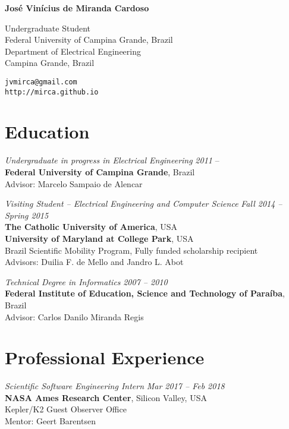 \documentclass[10pt]{article}
\begin{document}
\pagestyle{empty}
\begin{titlepage}
     {\Large{\textbf{Jos\'e Vin\'icius de Miranda Cardoso}}}
     \vspace{.5cm}

    \begin{minipage}[b]{8cm}
     Undergraduate Student\\
     Federal University of Campina Grande, Brazil\\
     Department of Electrical Engineering\\
     Campina Grande, Brazil
    \end{minipage}
    \hfill
    \begin{minipage}[b]{4cm}
        \hfill \texttt{jvmirca@gmail.com}\\
        \texttt{http://mirca.github.io}
    \end{minipage}


\section*{Education}

\emph{Undergraduate in progress in Electrical Engineering} \hfill \textit{2011} --\\
\textbf{Federal University of Campina Grande}, Brazil\\
Advisor: Marcelo Sampaio de Alencar
\vspace{.5cm}

\emph{Visiting Student -- Electrical Engineering and Computer Science} \hfill \textit{Fall 2014 -- Spring 2015} \\
\textbf{The Catholic University of America}, USA\\
\textbf{University of Maryland at College Park}, USA \\
Brazil Scientific Mobility Program, Fully funded scholarship recipient \\
Advisors: Duilia F. de Mello and Jandro L. Abot
\vspace{.5cm}

\emph{Technical Degree in Informatics} \hfill \textit{2007 -- 2010}\\
\textbf{Federal Institute of Education, Science and Technology of Para\'iba}, Brazil \\
Advisor: Carlos Danilo Miranda Regis

\section*{Professional Experience}
\emph{Scientific Software Engineering Intern} \hfill \textit{Mar 2017 -- Feb 2018}
\\\textbf{NASA Ames Research Center}, Silicon Valley, USA
\\Kepler/K2 Guest Observer Office
\\Mentor: Geert Barentsen
\vspace{.5cm}


\end{titlepage}
\end{document}
